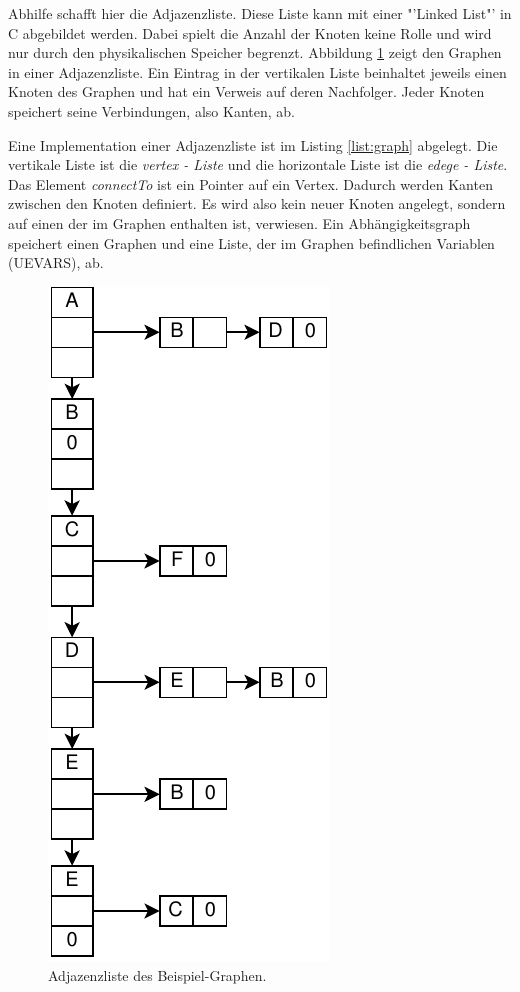 Abhilfe schafft hier die Adjazenzliste. Diese Liste kann mit einer "'Linked List"' in C abgebildet werden. Dabei spielt die Anzahl der Knoten keine Rolle und wird nur durch den physikalischen Speicher begrenzt. Abbildung \ref{fig:adjacencelist} zeigt den Graphen in einer Adjazenzliste. Ein Eintrag in der vertikalen Liste beinhaltet jeweils einen Knoten des Graphen und hat ein Verweis auf deren Nachfolger. Jeder Knoten speichert seine Verbindungen, also Kanten, ab. 

Eine Implementation einer Adjazenzliste ist im Listing \ref{list:graph} abgelegt. Die vertikale Liste ist die \textit{vertex - Liste} und die horizontale Liste ist die \textit{edege - Liste}. Das Element \textit{connectTo} ist ein Pointer auf ein Vertex. Dadurch werden Kanten zwischen den Knoten definiert. Es wird also kein neuer Knoten angelegt, sondern auf einen der im Graphen enthalten ist, verwiesen. Ein Abhängigkeitsgraph speichert einen Graphen und eine Liste, der im Graphen befindlichen Variablen (UEVARS), ab.
\begin{figure}[h]
	\centering
	\includegraphics[scale=0.8]{images/adjacencelist.pdf} 
	\caption{Adjazenzliste des Beispiel-Graphen.}
	\label{fig:adjacencelist}
\end{figure}

